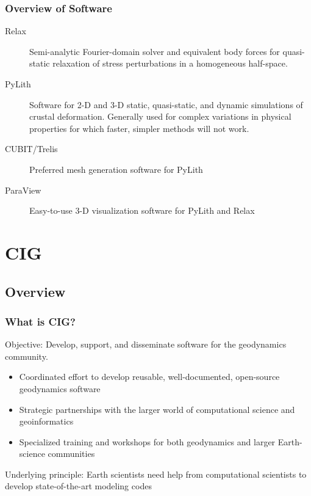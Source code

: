 \documentclass{beamer}
\begin{document}
\begin{frame}
  \frametitle{Overview of Software}
  
  \vfill
  \begin{description}
  \item[Relax] Semi-analytic Fourier-domain solver and equivalent body
    forces for quasi-static relaxation of stress perturbations in a
    homogeneous half-space.
  \item[PyLith] Software for 2-D and 3-D static, quasi-static, and
    dynamic simulations of crustal deformation. Generally used for
    complex variations in physical properties for which faster, simpler
    methods will not work.
  \item[CUBIT/Trelis] Preferred mesh generation software for PyLith
  \item[ParaView] Easy-to-use 3-D visualization software for PyLith and Relax
  \end{description}  

\end{frame}


\section{CIG}
\subsection{Overview}

\begin{frame}
  \frametitle{What is CIG?}
 
  \vfill

  Objective: Develop, support, and disseminate software for the
  geodynamics community.

  \vfill

  \begin{itemize}
  \item Coordinated effort to develop reusable, well-documented,
    open-source geodynamics software
  \item Strategic partnerships with the larger world of
    computational science and geoinformatics
  \item Specialized training and workshops for both geodynamics and
    larger Earth-science communities
  \end{itemize}

  \vfill
 
  Underlying principle: Earth scientists need help from computational
  scientists to develop state-of-the-art modeling codes

\end{frame}
\end{document}
